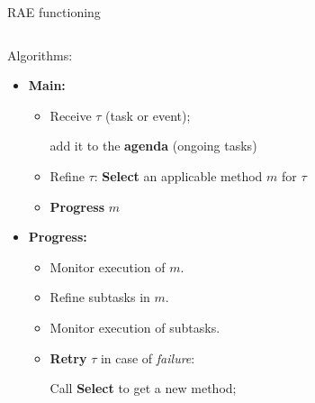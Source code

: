 \begin{frame}{RAE functioning}
    \begin{columns}[T]
  
        \begin{column}{0.65\textwidth}
            
            Algorithms:
            \small
            \begin{itemize}
                \setlength{\leftmargini}{-1pt}
                \item \textbf{Main:} 
                \begin{itemize}
                    \item Receive $\tau$ (task or event);
                    
                    add it to the \textbf{agenda} (ongoing tasks)
                    \item Refine $\tau$: \textbf{Select} an applicable method $m$ for $\tau$
                    \item \textbf{Progress} $m$
                \end{itemize}
                \item \textbf{Progress:}
                    \begin{itemize}
                        \item Monitor execution of $m$.
                        \item Refine subtasks in $m$.    
                        \item Monitor execution of subtasks.
                        \item \textbf{Retry} $\tau$ in case of \emph{failure}:
                    
                    Call \textbf{Select} to get a new method;
                    

\end{itemize}
\end{itemize}
\end{column}
\end{columns}
\end{frame}
